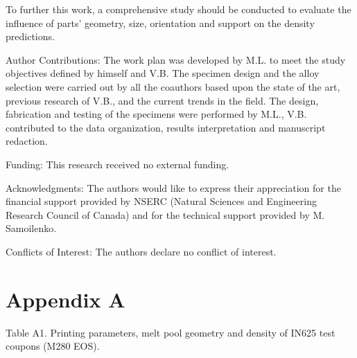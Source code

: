 \documentclass[10pt]{article}
\begin{document}
To further this work, a comprehensive study should be conducted to evaluate the influence of parts' geometry, size, orientation and support on the density predictions.

Author Contributions: The work plan was developed by M.L. to meet the study objectives defined by himself and V.B. The specimen design and the alloy selection were carried out by all the coauthors based upon the state of the art, previous research of V.B., and the current trends in the field. The design, fabrication and testing of the specimens were performed by M.L., V.B. contributed to the data organization, results interpretation and manuscript redaction.

Funding: This research received no external funding.

Acknowledgments: The authors would like to express their appreciation for the financial support provided by NSERC (Natural Sciences and Engineering Research Council of Canada) and for the technical support provided by M. Samoilenko.

Conflicts of Interest: The authors declare no conflict of interest.

\section*{Appendix A}
Table A1. Printing parameters, melt pool geometry and density of IN625 test coupons (M280 EOS).
\end{document}
